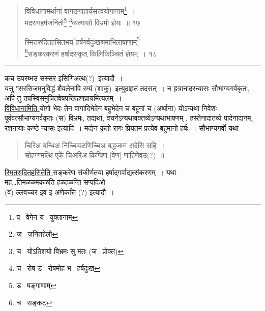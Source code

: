 \documentclass[11pt, openany]{book}
\begin{document}
\newpage

\begin{quote}
 {\na विविधानामर्थानां वागङ्गाहार्यसत्त्वयोगानाम्\renewcommand{\thefootnote}{1}\footnote{प \textendash\ वेगेन य \textendash\ युक्तानाम्}~। \\
 मदरागहर्षजनितो\renewcommand{\thefootnote}{2}\footnote{ज \textendash\ जनितहेलो} \renewcommand{\thefootnote}{3}\footnote{च \textendash\ योऽतिशयो विभ्रमः सु मतः (ज \textendash\ प्रोक्त) }व्यत्यासो विभ्रमो ज्ञेयः~॥ १७ 

 स्मितरुदितहसितभय\renewcommand{\thefootnote}{4}\footnote{च \textendash\ रोष ड \textendash\ रोषमोह भ \textendash\ हर्षदुःख}हर्षगर्वदुःखश्रमाभिलाषाणाम्\renewcommand{\thefootnote}{5}\footnote{ड \textendash\ षङ्गाणाम्}\\ 
\renewcommand{\thefootnote}{6}\footnote{च \textendash\ सङ्कट}सङ्करकरणं हर्षादसकृत् किलिकिञ्चितं ज्ञेयम्~। १८ }
\end{quote}

\hrule

\vspace{2mm}

कच उपरब्भउ सस्सर इसिणिअत्थ(?)\textendash\ इत्यादौ~। \\

यत्तु "सरसिजमनुविद्धं शैवलेनापि रम्यं (शाकु)\textendash\ इत्युदाहृतं तदसत्~। न ह्रत्रानादरन्यासः सौभाग्यगर्वकृतः, अपि तु तपस्विसमुचितवेषपरिग्रहणप्रायमित्यलम्~। \\

\underline{विविधानामिति }योगो भेदः तेन वागादिभेदेन बहुभेदेन च बहूनां च (अर्थाना) योऽन्यथा निवेशः पूर्ववत्सौभाग्यगर्वकृतः (स) विभ्रमः, तद्यथा, वचनेऽन्यथावक्तव्येऽन्यथाभाषणम् , हस्तेनादातव्ये पादेनादानम्, रशनायाः कण्ठे न्यासः इत्यादि~। मद्येन कृतो रागः प्रियतमं प्रत्येव बहुमानो हर्षः~। सौभाग्यगर्वो यथा\textendash\ \\

\begin{quote}
 {\qt चिरिअ बन्धिअ निच्चिप्पटणिच्चिअ बद्धजम्म अदेसि सहि~। \\
 सोहग्गमत्थि ए्कें चिअरिअ किप्पिण [वेण] णाहिणेवउ(?)~॥ }
\end{quote}

 \underline{स्मितरुदि॒तहसितेति }सङ्करेण संकीर्णतया हर्षाद्गर्वाद्यत्संकरणम्~। यथा\textendash\ \\

मह\ldots तिमळळमकळति हळहळन्ति सप्पदिओ\\

(व) ल्लवच्चर इव इ अणेकत्ति (?) इत्यादौ~। \\
\end{document}
